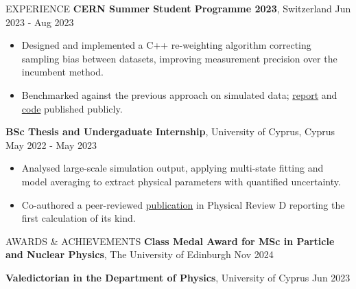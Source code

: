 \documentclass{resume} %
\begin{document}
\begin{rSection}{EXPERIENCE}
                \textbf{CERN Summer Student Programme 2023}, Switzerland  \hfill Jun 2023 - Aug 2023\\
                \vspace{-1.5em}
                \begin{itemize}
                        \itemsep -2pt {}
                        \item Designed and implemented a C++ re-weighting algorithm correcting sampling bias between datasets, improving measurement precision over the incumbent method.
                        \item Benchmarked against the previous approach on simulated data; \href{https://cds.cern.ch/record/2866568/}{report} and \href{https://github.com/GiorgosChr/CERN_Summer_Student_Programme_2023}{code} published publicly.
                \end{itemize}

                \textbf{BSc Thesis and Undergaduate Internship}, University of Cyprus, Cyprus \hfill May 2022 - May 2023\\
                \vspace{-1.5em}
                \begin{itemize}
                        \itemsep -2pt {} 
                        \item Analysed large-scale simulation output, applying multi-state fitting and model averaging to extract physical parameters with quantified uncertainty.
                        \item Co-authored a peer-reviewed \href{https://arxiv.org/abs/2309.04401}{publication} in Physical Review D reporting the first calculation of its kind.
                \end{itemize}
        \end{rSection} 

        \vspace{-0.5em}

        \begin{rSection}{AWARDS \& ACHIEVEMENTS}
                {\bf Class Medal Award for MSc in Particle and Nuclear Physics}, The University of Edinburgh \hfill Nov 2024

                {\bf Valedictorian in the Department of Physics}, University of Cyprus \hfill Jun 2023
        \end{rSection} 
\end{document}
